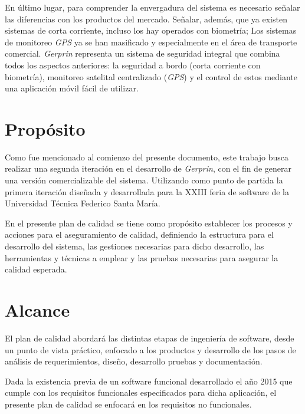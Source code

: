  En último lugar, para comprender la envergadura del sistema es necesario señalar las diferencias con los productos del mercado. Señalar, además, que ya existen sistemas de corta corriente, incluso los hay operados con biometría; Los sistemas de monitoreo \emph{GPS} ya se han masificado y especialmente en el área de transporte comercial. \emph{Gerprin} representa un sistema de seguridad integral que combina todos los aspectos anteriores: la seguridad a bordo (corta corriente con biometría), monitoreo satelital centralizado (\emph{GPS}) y el control de estos mediante una aplicación móvil fácil de utilizar.

\section{Propósito}

Como fue mencionado al comienzo del presente documento, este trabajo busca realizar una segunda iteración en el desarrollo de \emph{Gerprin}, con el fin de generar una versión comercializable del sistema. Utilizando como punto de partida la primera iteración diseñada y desarrollada para la XXIII feria de software de la Universidad Técnica Federico Santa María.

En el presente plan de calidad se tiene como propósito establecer los procesos y acciones para el aseguramiento de calidad, definiendo la estructura para el desarrollo del sistema, las gestiones necesarias para dicho desarrollo, las herramientas y técnicas a emplear y las pruebas necesarias para asegurar la calidad esperada.

\section{Alcance}

El plan de calidad abordará las distintas etapas de ingeniería de software, desde un punto de vista práctico, enfocado a los productos y desarrollo de los pasos de análisis de requerimientos, diseño, desarrollo pruebas y documentación.

Dada la existencia previa de un software funcional desarrollado el año 2015 que cumple con los requisitos funcionales especificados para dicha aplicación, el presente plan de calidad se enfocará en los requisitos no funcionales.